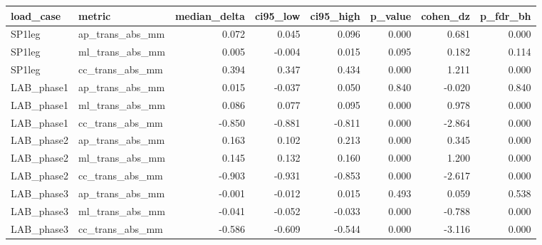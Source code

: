 \begin{tabular}{llrrrrrr}
\toprule
load\_case & metric & median\_delta & ci95\_low & ci95\_high & p\_value & cohen\_dz & p\_fdr\_bh \\
\midrule
SP1leg & ap\_trans\_abs\_mm & 0.072 & 0.045 & 0.096 & 0.000 & 0.681 & 0.000 \\
SP1leg & ml\_trans\_abs\_mm & 0.005 & -0.004 & 0.015 & 0.095 & 0.182 & 0.114 \\
SP1leg & cc\_trans\_abs\_mm & 0.394 & 0.347 & 0.434 & 0.000 & 1.211 & 0.000 \\
LAB\_phase1 & ap\_trans\_abs\_mm & 0.015 & -0.037 & 0.050 & 0.840 & -0.020 & 0.840 \\
LAB\_phase1 & ml\_trans\_abs\_mm & 0.086 & 0.077 & 0.095 & 0.000 & 0.978 & 0.000 \\
LAB\_phase1 & cc\_trans\_abs\_mm & -0.850 & -0.881 & -0.811 & 0.000 & -2.864 & 0.000 \\
LAB\_phase2 & ap\_trans\_abs\_mm & 0.163 & 0.102 & 0.213 & 0.000 & 0.345 & 0.000 \\
LAB\_phase2 & ml\_trans\_abs\_mm & 0.145 & 0.132 & 0.160 & 0.000 & 1.200 & 0.000 \\
LAB\_phase2 & cc\_trans\_abs\_mm & -0.903 & -0.931 & -0.853 & 0.000 & -2.617 & 0.000 \\
LAB\_phase3 & ap\_trans\_abs\_mm & -0.001 & -0.012 & 0.015 & 0.493 & 0.059 & 0.538 \\
LAB\_phase3 & ml\_trans\_abs\_mm & -0.041 & -0.052 & -0.033 & 0.000 & -0.788 & 0.000 \\
LAB\_phase3 & cc\_trans\_abs\_mm & -0.586 & -0.609 & -0.544 & 0.000 & -3.116 & 0.000 \\
\bottomrule
\end{tabular}
